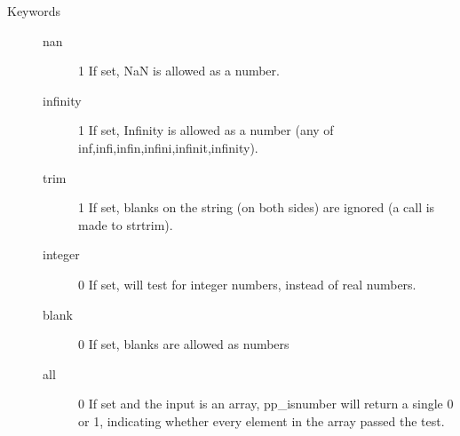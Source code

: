 \begin{description}
\item[Keywords]\hspace*{0em} \newline
\begin{description}

\item[nan]\hspace*{1em} {\footnotesize {}  1} \newline       If set, NaN is allowed as a number.
 
 

\item[infinity]\hspace*{1em} {\footnotesize {}  1} \newline       If set, Infinity is allowed as a number
       (any of inf,infi,infin,infini,infinit,infinity).
 
 

\item[trim]\hspace*{1em} {\footnotesize {}  1} \newline       If set, blanks on the string (on both sides) are ignored (a call is made
       to strtrim).
 
 

\item[integer]\hspace*{1em} {\footnotesize {}  0} \newline       If set, will test for integer numbers, instead of real numbers.
 
 

\item[blank]\hspace*{1em} {\footnotesize {}  0} \newline       If set, blanks are allowed as numbers
 
 

\item[all]\hspace*{1em} {\footnotesize {}  0} \newline       If set and the input is an array, pp\_isnumber will return a single 0 or 1,
       indicating whether every element in the array passed the test.
 
 
 

\end{description}
\end{description}



